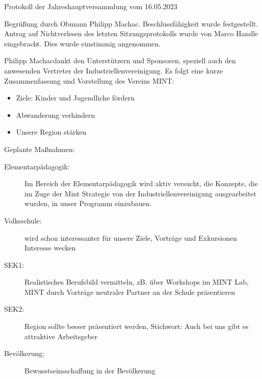 \documentclass{scrartcl}
\newcommand\vereinName{Träger und Förderverein Mint Oberland}
\newcommand\obmann{Philipp Machac}
\begin{document}
\begin{Minutes}{Protokoll der Jahreshauptversammlung vom 16.05.2023}

  \subtitle{\vereinName}
  \moderation{\obmann}

  \maketitle
  \newpage

  Begrüßung durch Obmann \obmann.
  Beschlussfähigkeit wurde festgestellt.
  Antrag auf Nichtverlesen des letzten Sitzungsprotokolls wurde von Marco Handle eingebracht. Dies wurde einstimmig angenommen. 



  \obmann  dankt den Unterstützern und Sponsoren, speziell auch den anwesenden Vertreter der Industriellenvereinigung.
  Es folgt eine kurze Zusammenfassung und Vorstellung des Vereins MINT:
  \begin{itemize}
    \item Ziele: Kinder und Jugendliche fördern
    \item Abwanderung verhindern
    \item Unsere Region stärken
  \end{itemize}
  Geplante Maßnahmen:
  \begin{description}
    \item [Elementarpädagogik:] Im Bereich der Elementarpädagogik wird aktiv versucht, die Konzepte, die im Zuge der Mint Strategie von der Industriellenvereinigung ausgearbeitet wurden, in unser Programm einzubauen.
    \item [Volksschule:] wird schon interessanter für unsere Ziele, Vorträge und Exkursionen Interesse wecken
    \item [SEK1:] Realistisches Berufsbild vermitteln, zB. über Workshops im MINT Lab, MINT durch Vorträge neutraler Partner an der Schule präsentieren
    \item [SEK2:] Region sollte besser präsentiert werden, Stichwort: \glqq Auch bei uns gibt es attraktive Arbeitsgeber\grqq{}
    \item [Bevölkerung:] Bewusstseinsschaffung in der Bevölkerung
  \end{description}


\end{Minutes}
\end{document}
